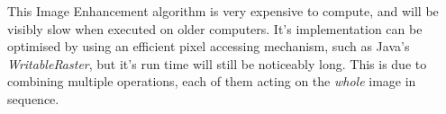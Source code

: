 \documentclass[journal,transmag]{IEEEtran}
\begin{document}
This Image Enhancement algorithm is very expensive to compute, and will be visibly slow when executed on older computers. It's implementation can be optimised by using an efficient pixel accessing mechanism, such as Java's \textit{WritableRaster}, but it's run time will still be noticeably long. This is due to combining multiple operations, each of them acting on the \textit{whole} image in sequence.

\begin{figure}[t]
	\centering
	 \\
\end{figure}
\end{document}
